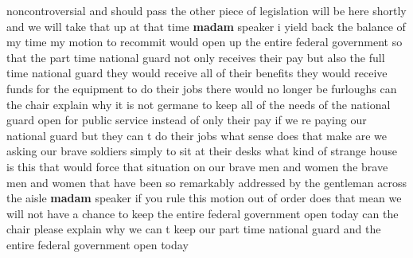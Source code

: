 \documentclass{article}
\begin{document}
noncontroversial and should pass the other piece of legislation will be here shortly and we will take that up at that time {\bf \color{red} madam} speaker i yield back the balance of my time
\vspace{8mm}
my motion to recommit would open up the entire federal government so that the part time national guard not only receives their pay but also the full time national guard they would receive all of their benefits they would receive funds for the equipment to do their jobs there would no longer be furloughs can the chair explain why it is not germane to keep all of the needs of the national guard open for public service instead of only their pay if we re paying our national guard but they can t do their jobs what sense does that make are we asking our brave soldiers simply to sit at their desks what kind of strange house is this that would force that situation on our brave men and women the brave men and women that have been so remarkably addressed by the gentleman across the aisle {\bf \color{red} madam} speaker if you rule this motion out of order does that mean we will not have a chance to keep the entire federal government open today can the chair please explain why we can t keep our part time national guard and the entire federal government open today\pagebreak
\end{document}
